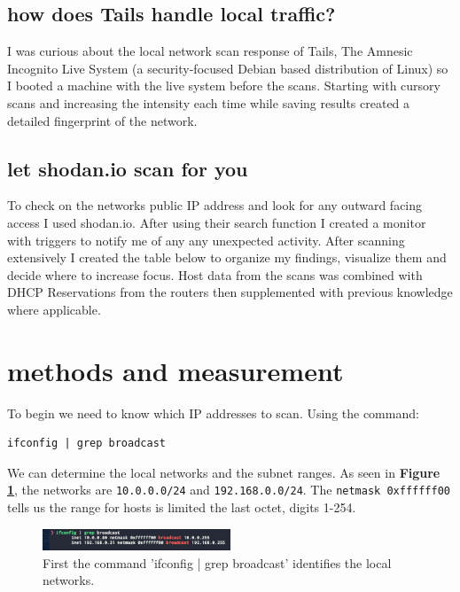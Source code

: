 \documentclass[10pt]{article}
\begin{document}
\subsection*{how does Tails handle local traffic?}

I was curious about the local network scan response of Tails, The Amnesic Incognito Live System (a security-focused Debian based distribution of Linux) so I booted a machine 
with the live system before the scans. Starting with cursory scans and increasing the intensity each time while saving results created a detailed fingerprint 
of the network.

\subsection*{let shodan.io scan for you}

To check on the networks public IP address and look for any outward facing access I used shodan.io.\cite{shodan}
After using their search function I created a monitor with triggers to notify me of any any unexpected activity. After scanning extensively I created the table below to organize
my findings, visualize them and decide where to increase focus. Host data from the scans was combined with DHCP Reservations from the routers then supplemented with previous knowledge 
where applicable.

\section*{methods and measurement}
To begin we need to know which IP addresses to scan. Using the command: \begin{verbatim}ifconfig | grep broadcast\end{verbatim} 
We can determine the local networks and the subnet ranges. As seen in \textbf{Figure \ref{ifconfig image}}, the networks are \verb|10.0.0.0/24|
and \verb|192.168.0.0/24|. The \verb|netmask 0xffffff00| tells us the range for hosts is limited the last octet, digits 1-254.

\begin{figure}[H]
\centering
\includegraphics[width=0.5\textwidth]{images/ifconfig.png}
\caption{First the command 'ifconfig | grep broadcast' identifies the local networks.}\label{ifconfig image}
\end{figure}
\end{document}
